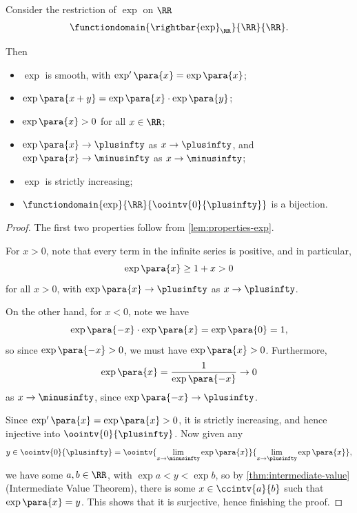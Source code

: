 \begin{lemma}
    \label{lem:properties-exp-r}%
    Consider the restriction of \(\exp\) on \(\RR\)
    \[
        \functiondomain{\rightbar{\exp}_{\RR}}{\RR}{\RR}.
    \]

    Then
    \begin{itemize}
        \item \(\exp\) is smooth, with \(\exp'\para{x} = \exp\para{x}\);
        \item \(\exp\para{x + y} = \exp\para{x} \cdot \exp\para{y}\);
        \item \(\exp\para{x} > 0\) for all \(x \in \RR\);
        \item \(\exp \para{x} \to \plusinfty\) as \(x \to \plusinfty\), and \(\exp \para{x} \to \minusinfty\) as \(x \to \minusinfty\);
        \item \(\exp\) is strictly increasing;
        \item \(\functiondomain{\exp}{\RR}{\oointv{0}{\plusinfty}}\) is a bijection.
    \end{itemize}
\end{lemma}

\begin{proof}
    The first two properties follow from \autoref{lem:properties-exp}.

    For \(x > 0\), note that every term in the infinite series is positive, and in particular,
    \[
        \exp\para{x} \geq 1 + x > 0
    \]
    for all \(x > 0\), with \(\exp\para{x} \to \plusinfty\) as \(x \to \plusinfty\).

    On the other hand, for \(x < 0\), note we have
    \[
        \exp\para{-x} \cdot \exp\para{x} = \exp\para{0} = 1,
    \]
    so since \(\exp\para{-x} > 0\), we must have \(\exp\para{x} > 0\). Furthermore,
    \[
        \exp\para{x} = \frac{1}{\exp\para{-x}} \to 0
    \]
    as \(x \to \minusinfty\), since \(\exp\para{-x} \to \plusinfty\).

    Since \(\exp'\para{x} = \exp\para{x} > 0\), it is strictly increasing, and hence injective into \(\oointv{0}{\plusinfty}\). Now given any
    \[
        y \in \oointv{0}{\plusinfty} = \oointv{\lim_{x \to \minusinfty} \exp\para{x}}{\lim_{x \to \plusinfty} \exp\para{x}},
    \]
    we have some \(a, b \in \RR\), with \(\exp a < y < \exp b\), so by \autoref{thm:intermediate-value} (Intermediate Value Theorem), there is some \(x \in \ccintv{a}{b}\) such that \(\exp\para{x} = y\). This shows that it is surjective, hence finishing the proof.
\end{proof}

